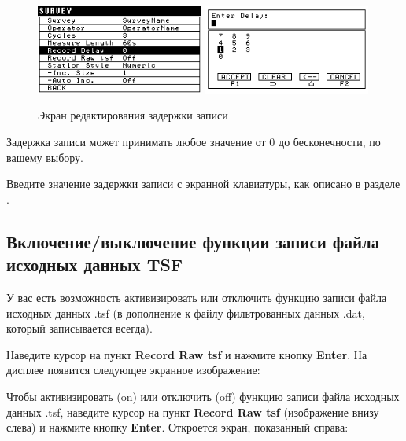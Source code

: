 \begin{figure}[H]
  \centering
  \includegraphics[width=0.49\textwidth]{figures/the_record_delay_editing_screen_1}
  \includegraphics[width=0.49\textwidth]{figures/the_record_delay_editing_screen_2}
  \caption{Экран редактирования задержки записи}
  \label{fig:the_record_delay_editing_screen}
\end{figure}

Задержка записи может принимать любое значение от 0 до бесконечности, по
вашему выбору.

Введите значение задержки записи с экранной клавиатуры, как описано в разделе
.

\subsection{Включение/выключение функции записи файла исходных данных TSF}

У вас есть возможность активизировать или отключить функцию записи файла
исходных данных .tsf (в дополнение к файлу фильтрованных данных .dat, который
записывается всегда).

Наведите курсор на пункт \textbf{Record Raw tsf} и нажмите кнопку
\textbf{Enter}. На дисплее появится следующее экранное изображение:

Чтобы активизировать (on) или отключить (off) функцию записи файла исходных
данных .tsf, наведите курсор на пункт \textbf{Record Raw tsf} (изображение внизу
слева) и нажмите кнопку \textbf{Enter}. Откроется экран, показанный справа:

